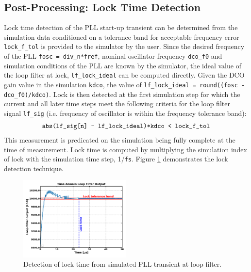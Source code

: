 \subsection{Post-Processing: Lock Time Detection}
Lock time detection of the PLL start-up transient can be determined from the simulation data conditioned on a tolerance band for acceptable frequency error \texttt{lock\_f\_tol} is provided to the simulator by the user. Since the desired frequency of the PLL \texttt{fosc = div\_n*fref}, nominal oscillator frequency \texttt{dco\_f0} and simulation conditions of the PLL are known by the simulator, the ideal value of the loop filter at lock, \texttt{lf\_lock\_ideal} can be computed directly. Given the DCO gain value in the simulation \texttt{kdco}, the value of \texttt{lf\_lock\_ideal = round((fosc - dco\_f0)/kdco)}. Lock is then detected at the first simulation step for which the current and all later time steps meet the following criteria for the loop filter signal \texttt{lf\_sig} (i.e. frequency of oscillator is within the frequency tolerance band):
\begin{equation}
\text{\texttt{abs(lf\_sig[n] - lf\_lock\_ideal)*kdco < lock\_f\_tol}}
\end{equation}
This measurement is predicated on the simulation being fully complete at the time of measurement. Lock time is computed by multiplying the simulation index of lock with the simulation time step, 1/\texttt{fs}. Figure \ref{fig:loop_filter_trans} demonstrates the lock detection technique.

\begin{figure}[htb!]
	\center\includegraphics[width=0.5\textwidth, angle=0]{figs/loop_filter_trans.pdf}
	\caption{Detection of lock time from simulated PLL transient at loop filter.}
	\label{fig:loop_filter_trans}
\end{figure}
\FloatBarrier

